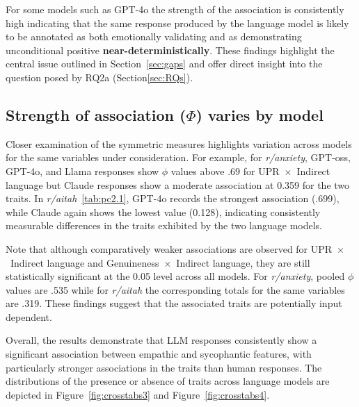 For some models such as GPT-4o the strength of the association is consistently high indicating that the same response produced by the language model is likely to be annotated as both emotionally validating and as demonstrating unconditional positive \textbf{near-deterministically}. These findings highlight the central issue outlined in Section~\ref{sec:gaps} and offer direct insight into the question posed by RQ2a (Section\ref{sec:RQs}).


\subsection{Strength of association (\texorpdfstring{$\Phi$}{Phi}) varies by model}

Closer examination of the symmetric measures highlights variation across models for the same variables under consideration. For example, for \textit{r/anxiety}, GPT-oss, GPT-4o, and Llama responses show $\phi$ values above .69 for UPR~$\times$~Indirect language but Claude responses show a moderate association at 0.359 for the two traits. In \textit{r/aitah}~\ref{tab:pc2.1}, GPT-4o records the strongest association (.699), while Claude again shows the lowest value (0.128), indicating consistently measurable differences in the traits exhibited by the two language models.

\medskip

\noindent
Note that although comparatively weaker associations are observed for UPR~$\times$~Indirect language and Genuineness~$\times$~Indirect language, they are still statistically significant at the 0.05 level across all models. For \textit{r/anxiety}, pooled $\phi$ values are .535 while for \textit{r/aitah} the corresponding totals for the same variables are .319. These findings suggest that the associated traits are potentially input dependent.

\medskip

\noindent
Overall, the results demonstrate that LLM responses consistently show a significant association between empathic and sycophantic features, with particularly stronger associations in the traits than human responses. The distributions of the presence or absence of traits across language models are depicted in Figure~\ref{fig:crosstabs3} and Figure~\ref{fig:crosstabs4}.


\renewcommand{\arraystretch}{1.4}

